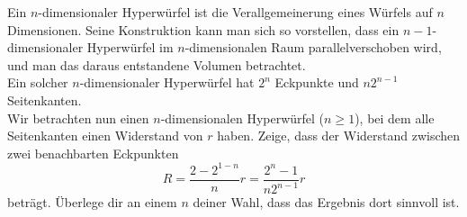 \begin{Exercise}[label = hypercube, origin = {Max Marienhagen}, difficulty = 5, title =  Widerstandswürfel]
Ein $n$-dimensionaler Hyperwürfel ist die Verallgemeinerung eines Würfels auf $n$ Dimensionen. Seine Konstruktion kann man sich so vorstellen, dass ein $n-1$-dimensionaler Hyperwürfel im $n$-dimensionalen Raum parallelverschoben wird, und man das daraus entstandene Volumen betrachtet.\\
Ein solcher $n$-dimensionaler Hyperwürfel hat $2^n$ Eckpunkte und $n2^{n-1}$ Seitenkanten.\\
Wir betrachten nun einen $n$-dimensionalen Hyperwürfel ($n\geq 1$), bei dem alle Seitenkanten einen Widerstand von $r$ haben. Zeige, dass der Widerstand zwischen zwei benachbarten Eckpunkten 
\begin{equation}
	R = \frac{2-2^{1-n}}{n}r = \frac{2^n-1}{n2^{n-1}}r
\end{equation}
beträgt. Überlege dir an einem $n$ deiner Wahl, dass das Ergebnis dort sinnvoll ist.
\end{Exercise}
